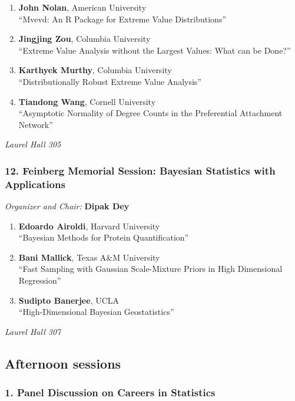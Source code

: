 \begin{enumerate}
\item \textbf{John Nolan}, American University \\
``Mvevd: An R Package for Extreme Value Distributions''
\item \textbf{Jingjing Zou}, Columbia University \\
``Extreme Value Analysis without the Largest Values: What can be Done?''
\item \textbf{Karthyek Murthy}, Columbia University \\
``Distributionally Robust Extreme Value Analysis''
\item \textbf{Tiandong Wang}, Cornell University \\
``Asymptotic Normality of Degree Counts in the Preferential Attachment Network''
\end{enumerate}

\emph{Laurel Hall 305} \\[.5em]

\subsubsection*{12. Feinberg Memorial Session: Bayesian Statistics with Applications}

\emph{Organizer and Chair:} \textbf{Dipak Dey}

\begin{enumerate}
\item \textbf{Edoardo Airoldi}, Harvard University \\
``Bayesian Methods for Protein Quantification''
\item \textbf{Bani Mallick}, Texas A\&M University \\
``Fast Sampling with Gaussian Scale-Mixture Priors in High Dimensional Regression''
\item \textbf{Sudipto Banerjee}, UCLA \\
``High-Dimensional Bayesian Geostatistics''
\end{enumerate}

\emph{Laurel Hall 307} \\[.5em]

\subsection*{Afternoon sessions}

\subsubsection*{1. Panel Discussion on Careers in Statistics}

